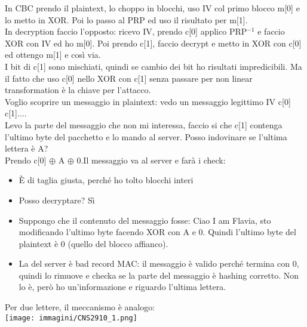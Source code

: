 \documentclass[16px]{article}
\begin{document}
In CBC prendo il plaintext, lo choppo in blocchi, uso IV col primo blocco m[0] e lo metto in XOR. Poi lo passo al PRP ed uso il risultato per m[1].\\ In decryption faccio l'opposto: ricevo IV, prendo c[0] applico PRP$^{-1}$ e faccio XOR con IV ed ho m[0]. Poi prendo c[1], faccio decrypt e metto in XOR con c[0] ed ottengo m[1] e così via.\\ I bit di c[1] sono mischiati, quindi se cambio dei bit ho risultati impredicibili. Ma il fatto che uso c[0] nello XOR con c[1] senza passare per non linear transformation è la chiave per l'attacco.\\ Voglio scoprire un messaggio in plaintext: vedo un messaggio legittimo IV c[0] c[1]....\\ Levo la parte del messaggio che non mi interessa, faccio si che c[1] contenga l'ultimo byte del pacchetto e lo mando al server. Posso indovinare se l'ultima lettera è A?\\ Prendo c[0] $\oplus$ A $\oplus$ 0.Il messaggio va al server e farà i check:
\begin{itemize}
\item È di taglia giusta, perché ho tolto blocchi interi
\item Posso decryptare? Sì
\item Suppongo che il contenuto del messaggio fosse: Ciao I am Flavia, sto modificando l'ultimo byte facendo XOR con A e 0. Quindi l'ultimo byte del plaintext è 0 (quello del blocco affianco).
\item La  del server è bad record MAC: il messaggio è valido perché termina con 0, quindi lo rimuove e checka se la parte del messaggio è hashing corretto. Non lo è, però ho un'informazione e riguardo l'ultima lettera.
\end{itemize}
Per due lettere, il meccanismo è analogo:\\
\texttt{[image: immagini/CNS2910\_1.png]}\\
\end{document}
